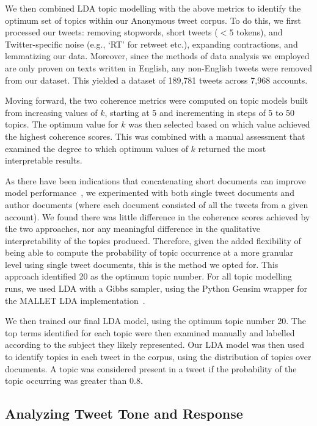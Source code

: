 \documentclass[letterpaper]{article}
\begin{document}
We then combined LDA topic modelling with the above metrics to identify the optimum set of topics within our Anonymous tweet corpus. To do this, we first processed our tweets: removing stopwords, short tweets ($<5$ tokens), and Twitter-specific noise (e.g., `RT' for retweet etc.), expanding contractions, and lemmatizing our data. Moreover, since the methods of data analysis we employed are only proven on texts written in English, any non-English tweets were removed from our dataset. This yielded a dataset of 189,781 tweets across 7,968 accounts.

Moving forward, the two coherence metrics were computed on topic models built from increasing values of $k$, starting at 5 and incrementing in steps of 5 to 50 topics. The optimum value for $k$ was then selected based on which value achieved the highest coherence scores. This was combined with a manual assessment that examined the degree to which optimum values of $k$ returned the most interpretable results.

As there have been indications that concatenating short documents can improve model performance~\cite{Kigerl2018}, we experimented with both single tweet documents and author documents (where each document consisted of all the tweets from a given account). We found there was little difference in the coherence scores achieved by the two approaches, nor any meaningful difference in the qualitative interpretability of the topics produced. Therefore, given the added flexibility of being able to compute the probability of topic occurrence at a more granular level using single tweet documents, this is the method we opted for. This approach identified 20 as the optimum topic number. For all topic modelling runs, we used LDA with a Gibbs sampler, using the Python Gensim wrapper for the MALLET LDA implementation~\cite{Gensim}.

We then trained our final LDA model, using the optimum topic number 20. The top terms identified for each topic were then examined manually and labelled according to the subject they likely represented. Our LDA model was then used to identify topics in each tweet in the corpus, using the distribution of topics over documents. A topic was considered present in a tweet if the probability of the topic occurring was greater than 0.8.

\subsection{Analyzing Tweet Tone and Response}
\end{document}
